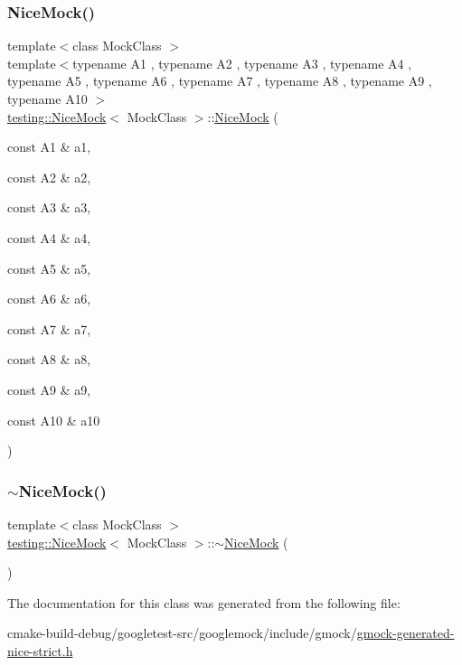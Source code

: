 \subsubsection{\texorpdfstring{NiceMock()}{NiceMock()}\hspace{0.1cm}{\footnotesize\ttfamily [11/11]}}
{\footnotesize\ttfamily template$<$class Mock\+Class $>$ \\
template$<$typename A1 , typename A2 , typename A3 , typename A4 , typename A5 , typename A6 , typename A7 , typename A8 , typename A9 , typename A10 $>$ \\
\mbox{\hyperlink{classtesting_1_1NiceMock}{testing\+::\+Nice\+Mock}}$<$ Mock\+Class $>$\+::\mbox{\hyperlink{classtesting_1_1NiceMock}{Nice\+Mock}} (\begin{DoxyParamCaption}\item[{const A1 \&}]{a1,  }\item[{const A2 \&}]{a2,  }\item[{const A3 \&}]{a3,  }\item[{const A4 \&}]{a4,  }\item[{const A5 \&}]{a5,  }\item[{const A6 \&}]{a6,  }\item[{const A7 \&}]{a7,  }\item[{const A8 \&}]{a8,  }\item[{const A9 \&}]{a9,  }\item[{const A10 \&}]{a10 }\end{DoxyParamCaption})\hspace{0.3cm}{\ttfamily [inline]}}

\mbox{\label{classtesting_1_1NiceMock_a30be5e5e20248f31c8390cd88fa74d7f}} 
\subsubsection{\texorpdfstring{$\sim$NiceMock()}{~NiceMock()}}
{\footnotesize\ttfamily template$<$class Mock\+Class $>$ \\
\mbox{\hyperlink{classtesting_1_1NiceMock}{testing\+::\+Nice\+Mock}}$<$ Mock\+Class $>$\+::$\sim$\mbox{\hyperlink{classtesting_1_1NiceMock}{Nice\+Mock}} (\begin{DoxyParamCaption}{ }\end{DoxyParamCaption})\hspace{0.3cm}{\ttfamily [inline]}}



The documentation for this class was generated from the following file\+:\begin{DoxyCompactItemize}
\item 
cmake-\/build-\/debug/googletest-\/src/googlemock/include/gmock/\mbox{\hyperlink{gmock-generated-nice-strict_8h}{gmock-\/generated-\/nice-\/strict.\+h}}\end{DoxyCompactItemize}
